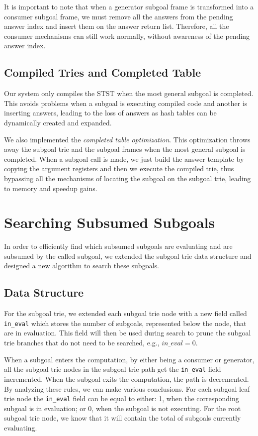 It is important to note that when a generator subgoal frame is transformed into a
consumer subgoal frame, we must remove all the answers from the pending answer index
and insert them on the answer return list. Therefore, all the consumer mechanisms
can still work normally, without awareness of the pending answer index.

\subsection{Compiled Tries and Completed Table}

Our system only compiles the STST when the most general subgoal is completed.
This avoids problems when a subgoal is executing compiled code and another
is inserting answers, leading to the loss of answers as hash tables can be
dynamically created and expanded.

We also implemented the \textit{completed table optimization}. This optimization throws
away the subgoal trie and the subgoal frames when the most general subgoal is completed.
When a subgoal call is made, we just build the answer template by copying the argument
registers and then we execute the compiled trie, thus bypassing all the mechanisms of
locating the subgoal on the subgoal trie, leading to memory and speedup gains. 

\section{Searching Subsumed Subgoals}

In order to efficiently find which subsumed subgoals are evaluating and are subsumed
by the called subgoal, we extended the subgoal trie data structure and designed a new
algorithm to search these subgoals.

\subsection{Data Structure}

For the subgoal trie, we extended each subgoal trie node with a new field called \texttt{in\_eval}
which stores the number of subgoals, represented below the node, that are in evaluation.
This field will then be used during search to prune the subgoal trie branches that do not
need to be searched, e.g., $in\_eval = 0$.

When a subgoal enters the computation, by either being a consumer or generator, all the
subgoal trie nodes in the subgoal trie path get the \texttt{in\_eval} field incremented.
When the subgoal exits the computation, the path is decremented.
By analyzing these rules, we can make various conclusions. For each subgoal leaf trie node
the \texttt{in\_eval} field can be equal to either: 1, when the corresponding subgoal is in
evaluation; or 0, when the subgoal is not executing. For the root subgoal trie node, we
know that it will contain the total of subgoals currently evaluating.

